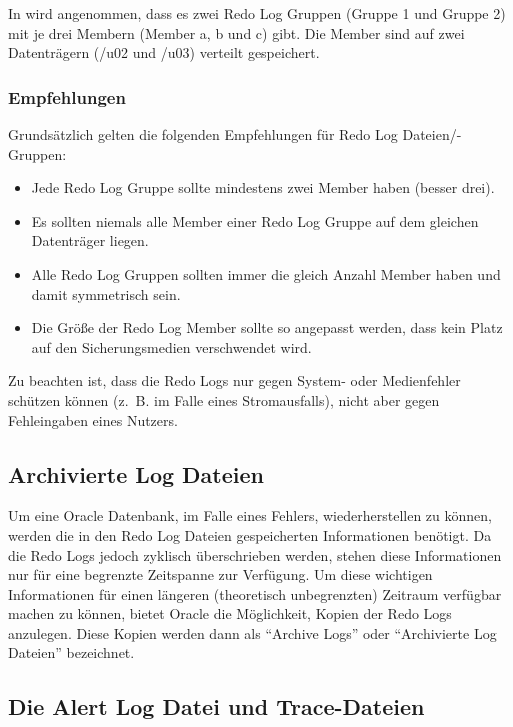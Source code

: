             In  wird angenommen, dass es zwei Redo Log Gruppen (Gruppe 1 und Gruppe 2) mit je drei Membern (Member a, b und c) gibt. Die Member sind auf zwei Datenträgern (/u02 und /u03) verteilt gespeichert.


          \subsubsection{Empfehlungen}
            Grundsätzlich gelten die folgenden Empfehlungen für Redo Log Dateien/-Gruppen:
            \begin{itemize}
              \item Jede Redo Log Gruppe sollte mindestens zwei Member haben (besser drei).
              \item Es sollten niemals alle Member einer Redo Log Gruppe auf dem gleichen Datenträger liegen.
              \item Alle Redo Log Gruppen sollten immer die gleich Anzahl Member haben und damit symmetrisch sein.
              \item Die Größe der Redo Log Member sollte so angepasst werden, dass kein Platz auf den Sicherungsmedien verschwendet wird.
            \end{itemize}
\clearpage
            \begin{merke}
              Zu beachten ist, dass die Redo Logs nur gegen System- oder Medienfehler schützen können (z.~B. im Falle eines Stromausfalls), nicht aber gegen Fehleingaben eines Nutzers.
            \end{merke}
        \subsection{Archivierte Log Dateien}
          Um eine Oracle Datenbank, im Falle eines Fehlers, wiederherstellen zu können, werden die in den Redo Log Dateien gespeicherten Informationen benötigt. Da die Redo Logs jedoch zyklisch überschrieben werden, stehen diese Informationen nur für eine begrenzte Zeitspanne zur Verfügung. Um diese wichtigen Informationen für einen längeren (theoretisch unbegrenzten) Zeitraum verfügbar machen zu können, bietet Oracle die Möglichkeit, Kopien der Redo Logs anzulegen. Diese Kopien werden dann als \enquote{Archive Logs} oder \enquote{Archivierte Log Dateien} bezeichnet.
        \subsection{Die Alert Log Datei und Trace-Dateien}
